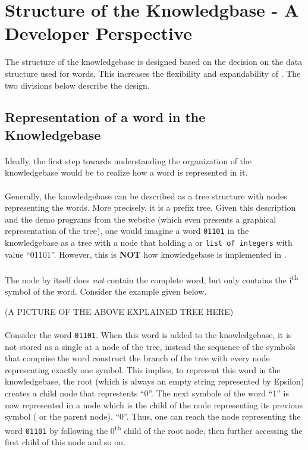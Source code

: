 \section{Structure of the Knowledgbase - A Developer Perspective}
	The structure of the knowledgebase is designed based on the decision on the data structure used for words. This increases the flexibility and expandability of \libalf. The two divisions below describe the design.

\subsection{Representation of a word in the Knowledgebase}
\paragraph{}
	Ideally, the first step towards understanding the organization of the knowledgebase would be to realize how a word is represented in it.
\paragraph{}
	Generally, the knowledgebase can be described as a tree structure with nodes representing the words. More precisely, it is a prefix tree. Given this description and the demo programs from the website (which even presents a graphical representation of the tree), one would imagine a word \texttt{01101} in the knowledgebase as a tree with a node that holding a \stringtype or \texttt{list of integers} with value ``01101''. However, this is \textbf{NOT} how knowledgebase is implemented in \libalf.
\paragraph{}
	The node by itself does \emph{not} contain the complete word, but only contains the i\textsuperscript{th} symbol of the word. Consider the example given below. \vskip 1pt
	
		(A PICTURE OF THE ABOVE EXPLAINED TREE HERE)
		
\paragraph{}	
	Consider the word \texttt{01101}. When this word is added to the knowledgebase, it is not stored as a single \stringtype at a node of the tree, instead the sequence of the symbols that comprise the word construct the branch of the tree with every node representing exactly one symbol. This implies, to represent this word in the knowledgebase, the root (which is always an empty string represented by Epsilon) creates a child node that represtents ``0''. The next symbole of the word ``1'' is now represented in a node which is the child of the node representing its previous symbol ( or the parent node), ``0''. Thus, one can reach the node representing the word \texttt{01101} by following the 0\textsuperscript{th} child of the root node, then further accessing the first child of this node and so on.
